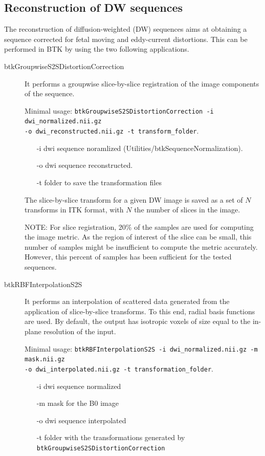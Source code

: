 \subsection{Reconstruction of DW sequences \cite{oubel_reconstruction_2010}}
\label{subsec:diff_rec}
The reconstruction of diffusion-weighted (DW) sequences aims at
obtaining a sequence corrected for fetal moving and eddy-current distortions.
This can be performed in BTK by using the two following applications. 
\begin{description}
\item[btkGroupwiseS2SDistortionCorrection] It performs a groupwise
slice-by-slice registration of the image components of the sequence.

Minimal usage: \texttt{btkGroupwiseS2SDistortionCorrection -i dwi\_normalized.nii.gz \\
-o dwi\_reconstructed.nii.gz -t transform\_folder}.

\begin{itemize}
 \item[-i] dwi sequence noramlized (Utilities/btkSequenceNormalization).
 \item[-o] dwi sequence reconstructed.
 \item[-t] folder to save the transformation files
\end{itemize}

The slice-by-slice transform for a given DW image is saved as a set of $N$
transforms in ITK format, with $N$ the number of slices in the image.

NOTE: For slice registration, 20\% of the samples are used for computing the
image metric. As the region of interest of the slice can be small, this number
of samples might be insufficient to compute the metric accurately. However,
this percent of samples has been sufficient for the tested sequences. 

\item[btkRBFInterpolationS2S] It performs an interpolation of scattered data
generated from the application of slice-by-slice transforms. To this end,
radial basis functions are used. By default, the output has isotropic
voxels of size equal to the in-plane resolution of the input.

Minimal usage: \texttt{btkRBFInterpolationS2S -i dwi\_normalized.nii.gz -m mask.nii.gz \\
-o dwi\_interpolated.nii.gz -t transformation\_folder}.

\begin{itemize}
 \item[-i] dwi sequence normalized
 \item[-m] mask for the B0 image
 \item[-o] dwi sequence interpolated 
 \item[-t] folder with the transformations generated by
\texttt{btkGroupwiseS2SDistortionCorrection}
\end{itemize}

\end{description}


